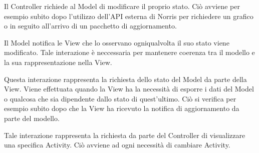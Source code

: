 	    Il Controller richiede al Model di modificare il proprio stato. Ciò avviene per esempio subito dopo l'utilizzo dell'API esterna di Norris per richiedere un grafico o in seguito all'arrivo di un pacchetto di aggiornamento.

	    Il Model notifica le View che lo osservano ogniqualvolta il suo stato viene modificato. Tale interazione è neccessaria per mantenere coerenza tra il modello e la sua rappresentazione nella View. 

	   	Questa interazione rappresenta la richiesta dello stato del Model da parte della View. Viene effettuata quando la View ha la necessità di esporre i dati del Model o qualcosa che sia dipendente dallo stato di quest'ultimo. Ciò si verifica per esempio subito dopo che la View ha ricevuto la notifica di aggiornamento da parte del modello.

	   	Tale interazione rappresenta la richiesta da parte del Controller di visualizzare una specifica Activity. Ciò avviene ad ogni necessità di cambiare Activity.


